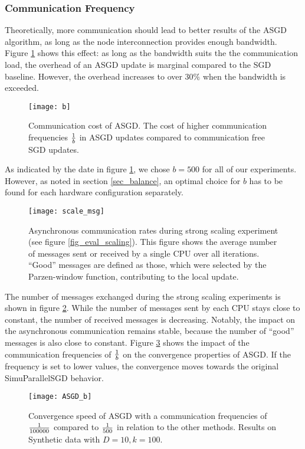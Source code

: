 \documentclass{acm_proc_article-sp}
\begin{document}
\subsubsection*{Communication Frequency\label{sec_ex_com}}
Theoretically, more communication should lead to better results of the ASGD 
algorithm, as long as the node interconnection provides enough bandwidth.
Figure \ref{fig_eval_b} shows this effect: as long as the bandwidth suits the
the communication load, the overhead of an ASGD update is marginal compared to 
the SGD baseline. However, the overhead increases to over $30\%$
when the bandwidth is exceeded.         
\begin{figure}[ht]
\texttt{[image: b]}
\caption{Communication cost of ASGD. The cost of higher communication 
frequencies $1\over b$ in ASGD updates compared to communication free SGD updates. 
\label{fig_eval_b}}
\end{figure}

As indicated by the date in figure \ref{fig_eval_b}, we chose $b=500$ for all of our 
experiments. However, as noted in section \ref{sec_balance}, an optimal choice 
for $b$ has to be found for each hardware configuration separately.
\begin{figure}[!ht]
\texttt{[image: scale\_msg]}
\caption{Asynchronous communication rates during strong scaling experiment (see
figure \ref{fig_eval_scaling}). This figure shows the average number of messages sent or
received by a single CPU over all iterations. ``Good'' messages are defined as
those, which were selected by the Parzen-window function, contributing to the
local update.
\label{fig_msg}}
\end{figure}
The number of messages exchanged during the strong scaling experiments is shown 
in figure \ref{fig_msg}. While the number of messages sent by each CPU stays 
close to constant, the number of received messages is decreasing. Notably, 
the impact on the asynchronous communication remains stable, because the number of
``good'' messages is also close to constant.    
Figure \ref{fig_eval_comim} shows the impact of the communication frequencies of $1\over b$ on the
convergence properties of ASGD. If the frequency is set to lower values, the convergence 
moves towards the original SimuParallelSGD behavior.
\begin{figure}[!ht]
\texttt{[image: ASGD\_b]}
\caption{Convergence speed of ASGD with a communication frequencies of $1\over 100000$ 
compared to $1\over 500$ in relation to the other methods. Results on Synthetic 
data with $D=10, k=100$.\label{fig_eval_comim}}
\end{figure}
\end{document}
